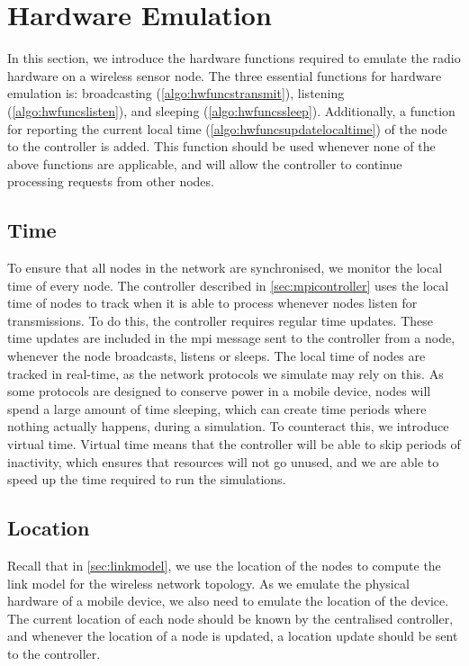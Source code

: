 \section{Hardware Emulation}\label{sec:mpiprotocol}
In this section, we introduce the hardware functions required to emulate the radio hardware on a wireless sensor node. The three essential functions for hardware emulation is: broadcasting (\autoref{algo:hwfuncstransmit}), listening (\autoref{algo:hwfuncslisten}), and sleeping (\autoref{algo:hwfuncssleep}). Additionally, a function for reporting the current local time (\autoref{algo:hwfuncsupdatelocaltime}) of the node to the controller is added. This function should be used whenever none of the above functions are applicable, and will allow the controller to continue processing requests from other nodes.

\subsection{Time}\label{sec:mpi:time}
To ensure that all nodes in the network are synchronised, we monitor the local time of every node. The controller described in \autoref{sec:mpicontroller} uses the local time of nodes to track when it is able to process whenever nodes listen for transmissions. To do this, the controller requires regular time updates. These time updates are included in the \acrshort{mpi} message sent to the controller from a node, whenever the node broadcasts, listens or sleeps. The local time of nodes are tracked in real-time, as the network protocols we simulate may rely on this. \smallbreak
As some protocols are designed to conserve power in a mobile device, nodes will spend a large amount of time sleeping, which can create time periods where nothing actually happens, during a simulation. To counteract this, we introduce virtual time. Virtual time means that the controller will be able to skip periods of inactivity, which ensures that resources will not go unused, and we are able to speed up the time required to run the simulations.

\subsection{Location}\label{sec:mpinodelocation} %
Recall that in \autoref{sec:linkmodel}, we use the location of the nodes to compute the link model for the wireless network topology. As we emulate the physical hardware of a mobile device, we also need to emulate the location of the device. The current location of each node should be known by the centralised controller, and whenever the location of a node is updated, a location update should be sent to the controller.

